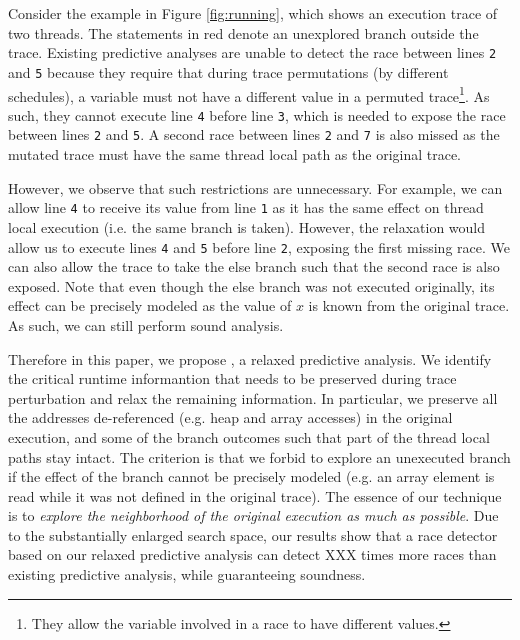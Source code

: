 Consider the example in Figure \ref{fig:running}, which shows an execution trace of two threads. The statements in red 
denote an unexplored branch outside the trace. Existing predictive analyses are unable to detect the race between 
lines {\tt 2} and {\tt 5} because they require that during trace permutations (by different schedules), a variable must not have
a different value in a permuted trace\footnote{They allow the variable involved in a race to have different values.}.
As such, they cannot execute line {\tt 4} before line {\tt 3}, which is needed to expose the race between lines {\tt 2}
and {\tt 5}. 
A second race between lines {\tt 2} and {\tt 7} is also missed as the mutated trace must have the same thread local
path as the original trace. 

However, we observe that such restrictions are unnecessary. For example, we can allow line {\tt 4} to receive its
value from line {\tt 1} as it has the same effect on thread local execution (i.e. the same branch is taken). 
However, the relaxation would allow us to execute lines {\tt 4} and {\tt 5} before line {\tt 2}, exposing 
the first missing race. We can also allow the trace to take the else branch such that the second race is also exposed. 
Note that even though the else branch was not executed originally, its effect can be precisely modeled as the value 
of $x$ is known from the original trace. As such, we can still perform sound analysis.

Therefore in this paper, we propose \sysname, a relaxed predictive analysis. We identify the critical runtime
informantion that needs to be preserved during trace perturbation and relax the remaining information. 
In particular, we preserve all the addresses de-referenced (e.g. heap and array accesses) in the original execution,
and some of the branch outcomes such that part of the thread local paths stay intact. The criterion is that
we forbid \sysname to explore an unexecuted branch if the effect of the branch cannot be precisely modeled
(e.g. an array element is read while it was not defined in the original trace). The essence of our technique 
is to {\em explore the neighborhood of the original execution as much as possible}. Due to the substantially
enlarged search space, our results show that a race detector based on our relaxed predictive analysis 
can detect XXX times more races than existing predictive analysis, while guaranteeing soundness. 

